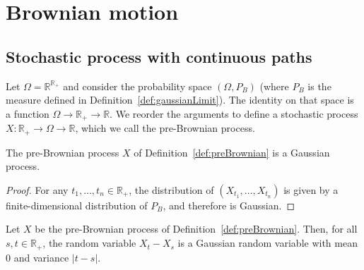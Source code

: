
\chapter{Brownian motion}
\label{chap:brownian}


\section{Stochastic process with continuous paths}

\begin{definition}\label{def:preBrownian}
  \leanok
Let $\Omega = \mathbb{R}^{\mathbb{R}_+}$ and consider the probability space $(\Omega, P_B)$ (where $P_B$ is the measure defined in Definition~\ref{def:gaussianLimit}).
The identity on that space is a function $\Omega \to \mathbb{R}_+ \to \mathbb{R}$.
We reorder the arguments to define a stochastic process $X : \mathbb{R}_+ \to \Omega \to \mathbb{R}$, which we call the pre-Brownian process.
\end{definition}


\begin{lemma}\label{lem:isGaussianProcess_preBrownian}
  \leanok
  The pre-Brownian process $X$ of Definition~\ref{def:preBrownian} is a Gaussian process.
\end{lemma}

\begin{proof}\leanok
For any $t_1, \ldots, t_n \in \mathbb{R}_+$, the distribution of $(X_{t_1}, \ldots, X_{t_n})$ is given by a finite-dimensional distribution of $P_B$, and therefore is Gaussian.
\end{proof}


\begin{lemma}\label{lem:hasLaw_preBrownian_sub}
  \leanok
Let $X$ be the pre-Brownian process of Definition~\ref{def:preBrownian}.
Then, for all $s, t \in \mathbb{R}_+$, the random variable $X_t - X_s$ is a Gaussian random variable with mean $0$ and variance $|t - s|$.
\end{lemma}

